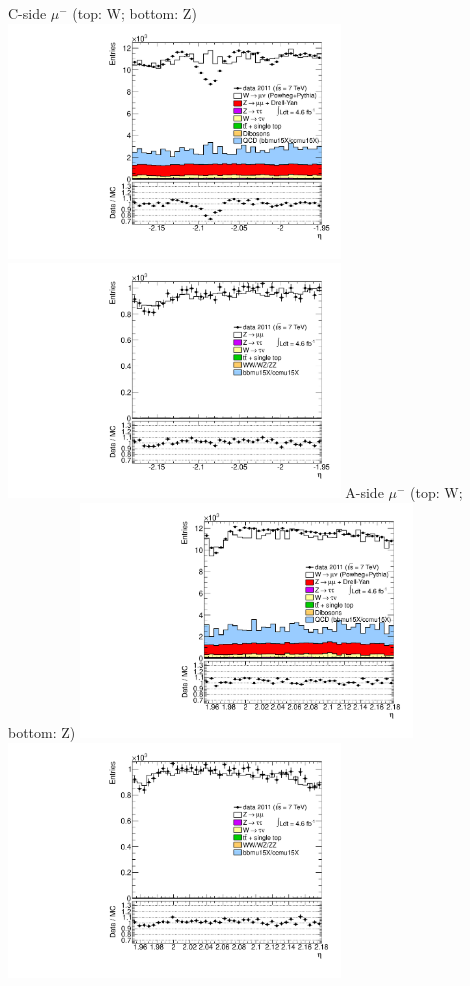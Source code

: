 {
\colb[T]
C-side $\mu^{-}$ (top: W; bottom: Z)
\centering
\includegraphics[width=0.66\textwidth]{dates/20130306/figures/etaphi/Wnometmtid_10_C_stack_l_eta_NEG} \\
\includegraphics[width=0.66\textwidth]{dates/20130306/figures/etaphi/Z_10_C_stack_lN_eta_ALL.pdf}
A-side $\mu^{-}$ (top: W; bottom: Z)
\centering
\includegraphics[width=0.66\textwidth]{dates/20130306/figures/etaphi/Wnometmtid_10_A_stack_l_eta_NEG} \\
\includegraphics[width=0.66\textwidth]{dates/20130306/figures/etaphi/Z_10_A_stack_lN_eta_ALL.pdf} 
\cole
}


